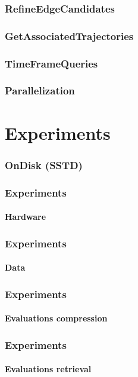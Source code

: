 \documentclass{beamer}
\begin{document}
\begin{frame}
	\frametitle{RefineEdgeCandidates}
\end{frame}

\begin{frame}
	\frametitle{GetAssociatedTrajectories}
\end{frame}

\begin{frame}
	\frametitle{TimeFrameQueries}
\end{frame}

\begin{frame}
	\frametitle{Parallelization}
\end{frame}

\section{Experiments}

\begin{frame}
	\frametitle{OnDisk (SSTD)}
\end{frame}

\begin{frame}
	\frametitle{Experiments}
	\framesubtitle{Hardware}
\end{frame}

\begin{frame}
	\frametitle{Experiments}
	\framesubtitle{Data}
\end{frame}

\begin{frame}
	\frametitle{Experiments}
	\framesubtitle{Evaluations compression}
\end{frame}

\begin{frame}
	\frametitle{Experiments}
	\framesubtitle{Evaluations retrieval}
\end{frame}
\end{document}
